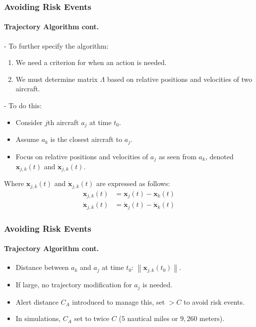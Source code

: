 \documentclass[UKenglish]{beamer}
\begin{document}
\begin{frame}
\frametitle{Avoiding Risk Events}
\framesubtitle{Trajectory Algorithm cont.}
- To further specify the algorithm:
\begin{enumerate}
    \item We need a criterion for when an action is needed.
    \item We must determine matrix $\Lambda$ based on relative positions and velocities of two aircraft.
\end{enumerate}
- To do this:
\begin{itemize}
    \item Consider \(j\)th aircraft \(a_j\) at time \(t_0\).
    \item Assume \(a_k\) is the closest aircraft to \(a_j\).
    \item Focus on relative positions and velocities of \(a_j\) as seen from \(a_k\), denoted $\boldsymbol{x}_{j,k}(t)$ and $\dot{\boldsymbol{x}}_{j,k}(t)$.
\end{itemize}
Where $\boldsymbol{x}_{j,k}(t)$ and $\dot{\boldsymbol{x}}_{j,k}(t)$ are expressed as follows: 
\begin{align*}
    \boldsymbol{x}_{j,k}(t) &= \boldsymbol{x}_{j}(t) - \boldsymbol{x}_{k}(t) \\[3pt]
    \dot{\boldsymbol{x}}_{j,k}(t) &= \dot{\boldsymbol{x}}_{j}(t) - \dot{\boldsymbol{x}}_{k}(t)
\end{align*}
\end{frame}
\begin{frame}
\frametitle{Avoiding Risk Events}
\framesubtitle{Trajectory Algorithm cont.}
\vspace{3mm}
\begin{itemize}
    \item Distance between \(a_k\) and \(a_j\) at time \(t_0\): \(\left\| \boldsymbol{x}_{j, k} (t_0) \right\|\).
    \item If large, no trajectory modification for \(a_j\) is needed.
    \item Alert distance \(C_A\) introduced to manage this, set \(> C\) to avoid risk events.
    \item In simulations, \(C_A\) set to twice \(C\) (\(5\) nautical miles or \(9,260\) meters).
\end{itemize}
\end{frame}
\end{document}
